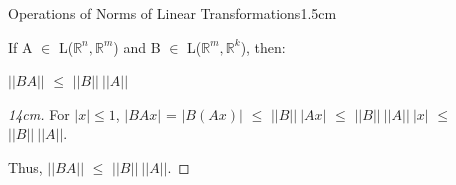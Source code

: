 \begin{ltheorem}{Operations of Norms of Linear Transformations}{1.5cm}
        \item If A $\in$ L($\mathbb{R}^n,\mathbb{R}^m$) and
            B $\in$ L($\mathbb{R}^m,\mathbb{R}^k$), then:

            \hspace{0.5cm}
            $||BA||$ $\leq$ $||B|| \ ||A||$

            \begin{proof}[14cm]
                For $|x| \leq 1$, 
                $|BAx|$
                = $|B(Ax)|$
                $\leq$ $||B|| \ |Ax|$
                $\leq$ $||B|| \ ||A|| \ |x|$
                $\leq$ $||B|| \ ||A||$.

                Thus, $||BA||$ $\leq$ $||B|| \ ||A||$.
            \end{proof}
    \end{ltheorem}

    \newpage



